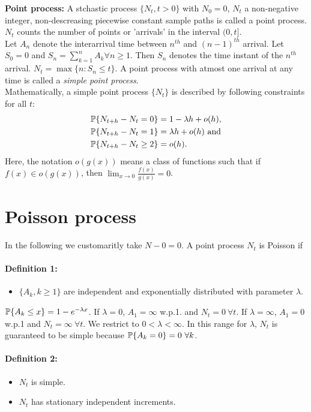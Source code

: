 \documentclass[a4paper,10pt,english]{article}
\begin{document}
\textbf{Point process:} A stchastic process $\{N_t, t > 0\}$ with $N_0 = 0$, $N_t$ a non-negative integer, non-descreasing piecewise constant sample paths is called a point process. $N_t$ counts the number of points or 'arrivals' in the interval $(0,t]$. \\
\indent Let $A_n$ denote the interarrival time between $n^{th}$ and $(n-1)^{th}$ arrival. Let $S_0 = 0$ and $S_n = \sum^n_{k=1} A_k \forall n \geq 1$. Then $S_n$ denotes the time instant of the $n^{th}$ arrival. $N_t = \max\{n: S_n \leq t\}$. A point process with atmost one arrival at any time is called a \textit{simple point process}.\\
\indent Mathematically, a simple point process $\{N_t\}$ is described by following constraints for all $t$:
\begin{align*}
\P\{N_{t+h} - N_t=  0 \} &= 1-\lambda h + o(h),\\
\P\{N_{t+h} - N_t=  1 \} &= \lambda h +o(h) \text{ and}\\
\P\{N_{t+h} - N_t \geq  2 \} &= o(h).\\
\end{align*} 
Here, the notation $o(g(x))$ means a class of functions such that if $f(x) \in o(g(x))$, then $\lim_{x\rightarrow 0} \frac{f(x)}{g(x)} =0$.
\section{Poisson process}
In the following we customaritly take $N-0 = 0$. A point process $N_t$ is Poisson if 
\paragraph{Definition 1:}{
\begin{itemize}
\item $\{A_k, k \geq 1\}$ are independent and exponentially distributed with parameter $\lambda$.
\end{itemize}
$\P\{A_k \leq x\} = 1 - e^{-\lambda x}$. If $\lambda = 0$, $A_1 = \infty$ w.p.1. and $N_t = 0 \ \forall t$. If $\lambda = \infty$, $A_1 = 0$ w.p.1 and $N_t = \infty \ \forall t$. We restrict to $0<\lambda<\infty$. In this range for $\lambda$, $N_t$ is guaranteed to be simple because $\P\{A_k = 0\} = 0 \ \forall k$.
}
\paragraph{Definition 2:}{
\begin{itemize}
\item $N_t$ is simple.
\item $N_t$ has stationary independent increments.
\end{itemize}
}
\end{document}
